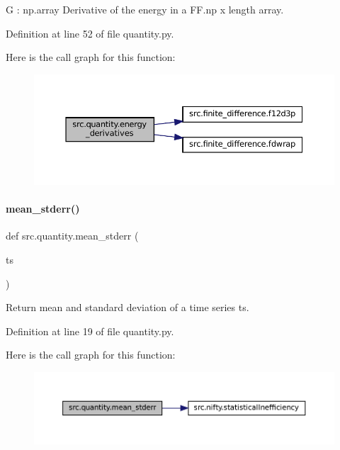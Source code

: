 G \+: np.\+array Derivative of the energy in a F\+F.\+np x length array. 

Definition at line 52 of file quantity.\+py.

Here is the call graph for this function\+:
\nopagebreak
\begin{figure}[H]
\begin{center}
\leavevmode
\includegraphics[width=350pt]{namespacesrc_1_1quantity_ad54b891da90cd132afe1a57dfde0f03f_cgraph}
\end{center}
\end{figure}
\mbox{\label{namespacesrc_1_1quantity_abf34041e04e73124655bf67566e8346b}} 
\paragraph{\texorpdfstring{mean\+\_\+stderr()}{mean\_stderr()}}
{\footnotesize\ttfamily def src.\+quantity.\+mean\+\_\+stderr (\begin{DoxyParamCaption}\item[{}]{ts }\end{DoxyParamCaption})}



Return mean and standard deviation of a time series ts. 



Definition at line 19 of file quantity.\+py.

Here is the call graph for this function\+:
\nopagebreak
\begin{figure}[H]
\begin{center}
\leavevmode
\includegraphics[width=350pt]{namespacesrc_1_1quantity_abf34041e04e73124655bf67566e8346b_cgraph}
\end{center}
\end{figure}


